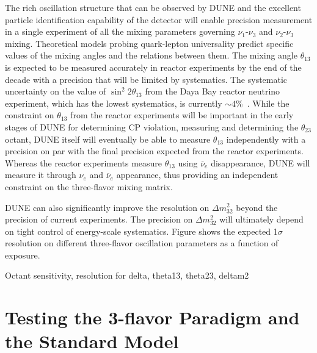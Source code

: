 The rich oscillation structure that can be observed by DUNE and the
excellent particle identification capability of the detector
will enable precision measurement  in a single experiment of all the mixing parameters
governing $\nu_1$-$\nu_3$ and $\nu_2$-$\nu_3$ mixing. Theoretical models probing quark-lepton
universality predict specific values of the mixing angles and the
relations between them. The
mixing angle $\theta_{13}$ is
expected to be measured accurately in reactor experiments by the end
of the decade with a precision that will be limited by
systematics. The systematic uncertainty on the value of $\sin ^ 2 2
\theta_{13}$ from the Daya Bay reactor neutrino experiment, which has
the lowest systematics, is currently $\sim4$\%~\cite{An:2013zwz}.
While the constraint on $\theta_{13}$ from the reactor experiments will be
important in the
early stages of DUNE for determining CP violation, measuring
\deltacp and determining the $\theta_{23}$ octant, 
DUNE itself will eventually be able to measure
$\theta_{13}$ independently with a precision on par with the final
precision expected from the reactor experiments. 
Whereas the reactor experiments measure $\theta_{13}$ using $\overline{\nu}_e$
disappearance, DUNE will measure it through $\nu_e$ and
$\overline{\nu}_e$ appearance, thus providing an independent constraint on
the three-flavor mixing matrix. 

DUNE can also significantly improve the
resolution on $\Delta m^2_{32}$ beyond the precision of current experiments.  The
precision on $\Delta m^2_{32}$ will ultimately depend on tight control
of energy-scale systematics.  Figure shows the expected 1$\sigma$ resolution
on different three-flavor oscillation parameters as a function of exposure.

Octant sensitivity, resolution for delta, theta13, theta23, deltam2

\section{Testing the 3-flavor Paradigm and the Standard Model}
\label{sec:physics-lbnosc-3nutests}

